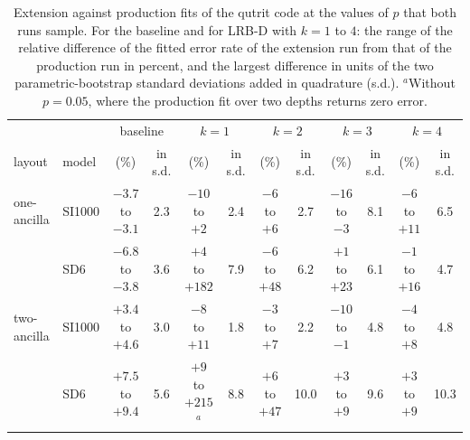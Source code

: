 \begin{table}[tp]
  \centering
  \footnotesize
  \setlength{\tabcolsep}{2.5pt}
  \begin{tabular}{ll|cc|cc|cc|cc|cc}
    \hline
    & & \multicolumn{2}{c|}{baseline} & \multicolumn{2}{c|}{$k = 1$} & \multicolumn{2}{c|}{$k = 2$} & \multicolumn{2}{c|}{$k = 3$} & \multicolumn{2}{c}{$k = 4$} \\
    layout & model & (\%) & in s.d. & (\%) & in s.d. & (\%) & in s.d. & (\%) & in s.d. & (\%) & in s.d. \\
    \hline
    one-ancilla & SI1000 & $-3.7$ to $-3.1$ & 2.3 & $-10$ to $+2$ & 2.4 & $-6$ to $+6$ & 2.7 & $-16$ to $-3$ & 8.1 & $-6$ to $+11$ & 6.5 \\
     & SD6 & $-6.8$ to $-3.8$ & 3.6 & $+4$ to $+182$ & 7.9 & $-6$ to $+48$ & 6.2 & $+1$ to $+23$ & 6.1 & $-1$ to $+16$ & 4.7 \\
    two-ancilla & SI1000 & $+3.4$ to $+4.6$ & 3.0 & $-8$ to $+11$ & 1.8 & $-3$ to $+7$ & 2.2 & $-10$ to $-1$ & 4.8 & $-4$ to $+8$ & 4.8 \\
     & SD6 & $+7.5$ to $+9.4$ & 5.6 & $+9$ to $+215$$^{a}$ & 8.8 & $+6$ to $+47$ & 10.0 & $+3$ to $+9$ & 9.6 & $+3$ to $+9$ & 10.3 \\
    \hline
  \end{tabular}
  \caption{Extension against production fits of the qutrit code at the values of $p$ that both runs sample. For the baseline and for LRB-D with $k = 1$ to $4$: the range of the relative difference of the fitted error rate of the extension run from that of the production run in percent, and the largest difference in units of the two parametric-bootstrap standard deviations added in quadrature (s.d.). $^{a}$Without $p = 0.05$, where the production fit over two depths returns zero error.}
  \label{tab:overlap}
\end{table}

